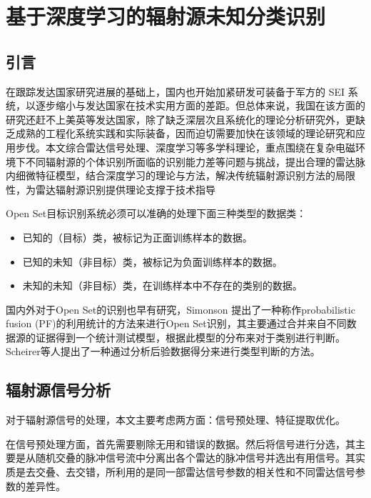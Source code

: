 \chapter{基于深度学习的辐射源未知分类识别}

\section{引言}


在跟踪发达国家研究进展的基础上，国内也开始加紧研发可装备于军方的 SEI 系统，以逐步缩小与发达国家在技术实用方面的差距。但总体来说，我国在该方面的研究还赶不上美英等发达国家，除了缺乏深层次且系统化的理论分析研究外，更缺乏成熟的工程化系统实践和实际装备，因而迫切需要加快在该领域的理论研究和应用步伐。本文综合雷达信号处理、深度学习等多学科理论，重点围绕在复杂电磁环境下不同辐射源的个体识别所面临的识别能力差等问题与挑战，提出合理的雷达脉内细微特征模型，结合深度学习的理论与方法，解决传统辐射源识别方法的局限性，为雷达辐射源识别提供理论支撑于技术指导

Open Set目标识别系统必须可以准确的处理下面三种类型的数据类：
\begin{itemize}
	\item 已知的（目标）类，被标记为正面训练样本的数据。
	\item 已知的未知（非目标）类，被标记为负面训练样本的数据。
	\item 未知的未知（非目标）类，在训练样本中不存在的类别的数据。
\end{itemize}

国内外对于Open Set的识别也早有研究，Simonson 提出了一种称作probabilistic fusion (PF)的利用统计的方法来进行Open Set识别，其主要通过合并来自不同数据源的证据得到一个统计测试模型，根据此模型的分布来对于类别进行判断。Scheirer等人提出了一种通过分析后验数据得分来进行类型判断的方法。


\section{辐射源信号分析}

对于辐射源信号的处理，本文主要考虑两方面：信号预处理、特征提取优化。

在信号预处理方面，首先需要剔除无用和错误的数据。然后将信号进行分选，其主要是从随机交叠的脉冲信号流中分离出各个雷达的脉冲信号并选出有用信号。其实质是去交叠、去交错，所利用的是同一部雷达信号参数的相关性和不同雷达信号参数的差异性。

